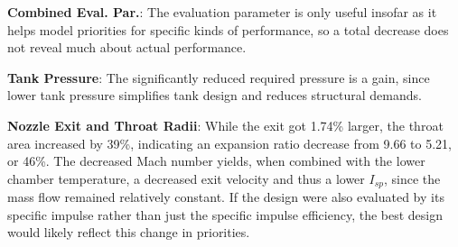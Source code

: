 \documentclass{homework}
\begin{document}
\begin{multicols}{2}
\textbf{Combined Eval. Par.}: The evaluation parameter is only useful insofar as it helps model priorities for specific kinds of performance, so a total decrease does not reveal much about actual performance.


\textbf{Tank Pressure}: The significantly reduced required pressure is a gain, since lower tank pressure simplifies tank design and reduces structural demands.

\textbf{Nozzle Exit and Throat Radii}: While the exit got 1.74\% larger, the throat area increased by 39\%, indicating an expansion ratio decrease from 9.66 to 5.21, or  46\%. The decreased Mach number yields, when combined with the lower chamber temperature, a decreased exit velocity and thus a lower $I_{sp}$, since the mass flow remained relatively constant. If the design were also evaluated by its specific impulse rather than just the specific impulse efficiency, the best design would likely reflect this change in priorities.







\end{multicols}
\end{document}
